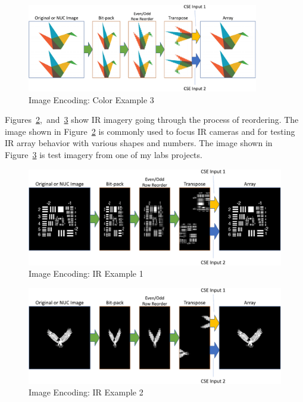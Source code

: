     \begin{figure}[H]
        \centering
        \includegraphics[trim=0 40pt 0 40pt,width=0.90\textwidth]{fig/image_encoding_origami.pdf}
        \caption{Image Encoding: Color Example 3}
        \label{fig:image_encoding_color_example3}
    \end{figure}

    Figures~\ref{fig:image_encoding_ir_example1},~and~\ref{fig:image_encoding_ir_example2} show IR imagery going through the process of reordering. The image shown in Figure~\ref{fig:image_encoding_ir_example1} is commonly used to focus IR cameras and for testing IR array behavior with various shapes and numbers. The image shown in Figure~\ref{fig:image_encoding_ir_example2} is test imagery from one of my labs projects.

    \begin{figure}[H]
        \centering
        \includegraphics[trim=0 40pt 0 0,width=1.0\textwidth]{fig/image_encoding_ir1.pdf}
        \caption{Image Encoding: IR Example 1}
        \label{fig:image_encoding_ir_example1}
    \end{figure}

    \begin{figure}[H]
        \centering
        \includegraphics[trim=0 40pt 0 40pt,width=1.0\textwidth]{fig/image_encoding_ir2.pdf}
        \caption{Image Encoding: IR Example 2}
        \label{fig:image_encoding_ir_example2}
    \end{figure}

